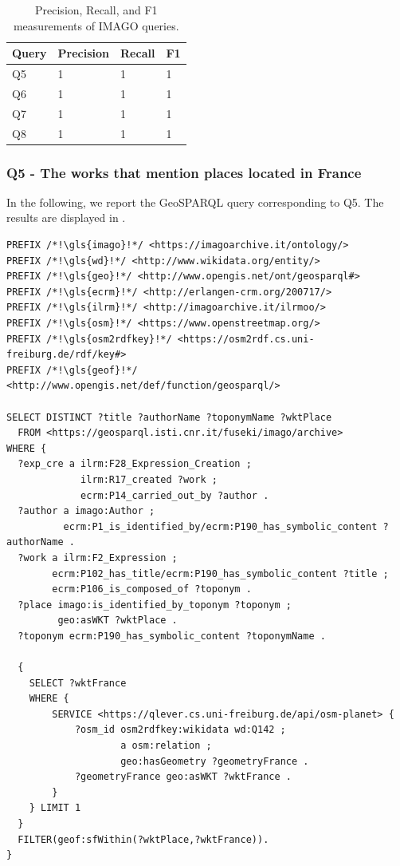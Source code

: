 \begin{table}[H]
    \centering
        \caption{Precision, Recall, and F1 measurements of IMAGO queries.}
    \label{tab:evaluationQueriesIMAGO}
    \begin{tabular}{|l|l|l|l|}
    \hline
 Query & Precision & Recall & F1\\
\hline
        Q5 & 1 & 1 & 1\\ \hline
        Q6 & 1 & 1 & 1\\ \hline
        Q7 & 1 & 1 & 1 \\  \hline
        Q8 & 1 & 1 & 1 \\ \hline
    \end{tabular}
\end{table}

\subsubsection*{Q5 - The works that mention places located in France}
In the following, we report the GeoSPARQL query corresponding to Q5. The results are displayed in .

\begin{lstlisting}[caption=GeoSPARQL Query 5, label={lst:query5}]
PREFIX /*!\gls{imago}!*/ <https://imagoarchive.it/ontology/>
PREFIX /*!\gls{wd}!*/ <http://www.wikidata.org/entity/>
PREFIX /*!\gls{geo}!*/ <http://www.opengis.net/ont/geosparql#>
PREFIX /*!\gls{ecrm}!*/ <http://erlangen-crm.org/200717/>
PREFIX /*!\gls{ilrm}!*/ <http://imagoarchive.it/ilrmoo/>
PREFIX /*!\gls{osm}!*/ <https://www.openstreetmap.org/>
PREFIX /*!\gls{osm2rdfkey}!*/ <https://osm2rdf.cs.uni-freiburg.de/rdf/key#>
PREFIX /*!\gls{geof}!*/ <http://www.opengis.net/def/function/geosparql/> 

SELECT DISTINCT ?title ?authorName ?toponymName ?wktPlace
  FROM <https://geosparql.isti.cnr.it/fuseki/imago/archive>
WHERE {
  ?exp_cre a ilrm:F28_Expression_Creation ;
  	         ilrm:R17_created ?work ;
  	         ecrm:P14_carried_out_by ?author .	
  ?author a imago:Author ;
          ecrm:P1_is_identified_by/ecrm:P190_has_symbolic_content ?authorName .
  ?work a ilrm:F2_Expression ;
        ecrm:P102_has_title/ecrm:P190_has_symbolic_content ?title ;
        ecrm:P106_is_composed_of ?toponym .
  ?place imago:is_identified_by_toponym ?toponym ;
         geo:asWKT ?wktPlace .
  ?toponym ecrm:P190_has_symbolic_content ?toponymName .

  { 
    SELECT ?wktFrance 
    WHERE {
        SERVICE <https://qlever.cs.uni-freiburg.de/api/osm-planet> { 
            ?osm_id osm2rdfkey:wikidata wd:Q142 ;
                    a osm:relation ;
                    geo:hasGeometry ?geometryFrance .
            ?geometryFrance geo:asWKT ?wktFrance .     
        } 
    } LIMIT 1
  }
  FILTER(geof:sfWithin(?wktPlace,?wktFrance)). 
} 
\end{lstlisting}

